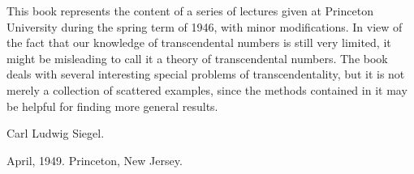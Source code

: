\begin{pre}
	
	\thispagestyle{empty}
	
	This book represents the content of a series of lectures given at Princeton University during the spring term of 1946, with minor modifications. In view of the fact that our knowledge of transcendental numbers is still very limited, it might be misleading to call it a theory of transcendental numbers. The book deals with several interesting special problems of transcendentality, but it is not merely a collection of scattered examples, since the methods contained in it may be helpful for finding more general results.

	Carl Ludwig Siegel.

	April, 1949. Princeton, New Jersey.

	\clearpage
	
\end{pre}
